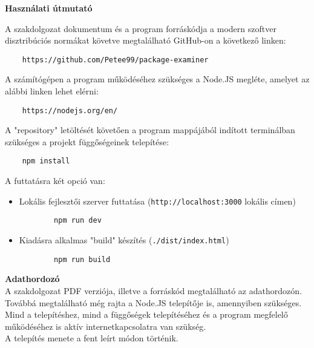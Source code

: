 \pagestyle{empty}

\noindent \textbf{\Large Használati útmutató}

\vskip 1cm

A szakdolgozat dokumentum és a program forráskódja a modern szoftver disztribúciós normákat követve megtalálható GitHub-on a következő linken:

\begin{verbatim}
	https://github.com/Petee99/package-examiner
\end{verbatim}

A számítógépen a program működéséhez szükséges a Node.JS megléte, amelyet az alábbi linken lehet elérni:

\begin{verbatim}
	https://nodejs.org/en/
\end{verbatim}

A "repository" letöltését követően a program mappájából indított terminálban szükséges a projekt függőségeinek telepítése:

\begin{verbatim}
	npm install
\end{verbatim}

A futtatásra két opció van:

\begin{itemize}
	\item Lokális fejlesztői szerver futtatása (\texttt{http://localhost:3000} lokális címen)
	\begin{verbatim}
		npm run dev
	\end{verbatim}
	\item Kiadásra alkalmas "build" készítés (\texttt{./dist/index.html})
	\begin{verbatim}
		npm run build
	\end{verbatim}
\end{itemize}

\noindent \textbf{Adathordozó}\\

A szakdolgozat PDF verziója, illetve a forráskód megtalálható az adathordozón. Továbbá megtalálható még rajta a Node.JS telepítője is, amennyiben szükséges.\\

Mind a telepítéshez, mind a függőségek telepítéséhez és a program megfelelő működéséhez is aktív internetkapcsolatra van szükség.\\

A telepítés menete a fent leírt módon történik.


